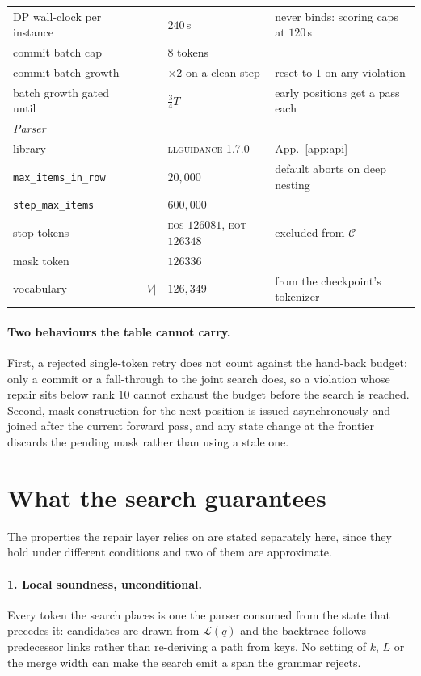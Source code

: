 \begin{center}
\begin{tabular}{llll}
DP wall-clock per instance&    & $240$\,s & never binds: scoring caps at $120$\,s \\
commit batch cap         &     & $8$ tokens & \\
commit batch growth      &     & $\times 2$ on a clean step & reset to $1$ on any violation \\
batch growth gated until &     & $\tfrac{3}{4}T$ & early positions get a pass each \\
\midrule
\multicolumn{4}{l}{\emph{Parser}}\\
library                  &     & \textsc{llguidance} 1.7.0 & App.~\ref{app:api} \\
\texttt{max\_items\_in\_row} & & $20{,}000$ & default aborts on deep nesting \\
\texttt{step\_max\_items}    & & $600{,}000$ & \\
stop tokens              &     & \textsc{eos} $126081$, \textsc{eot} $126348$ & excluded from $\mathcal{C}$ \\
mask token               &     & $126336$ & \\
vocabulary               & $|V|$ & $126{,}349$ & from the checkpoint's tokenizer \\
\bottomrule
\end{tabular}
\end{center}

\paragraph{Two behaviours the table cannot carry.}
First, a rejected single-token retry does not count against the hand-back
budget: only a commit or a fall-through to the joint search does, so a violation
whose repair sits below rank $10$ cannot exhaust the budget before the search is
reached. Second, mask construction for the next position is issued
asynchronously and joined after the current forward pass, and any state change
at the frontier discards the pending mask rather than using a stale one.

\section{What the search guarantees}
\label{app:properties}

The properties the repair layer relies on are stated separately here, since they
hold under different conditions and two of them are approximate.

\paragraph{1. Local soundness, unconditional.}
Every token the search places is one the parser consumed from the state that
precedes it: candidates are drawn from $\mathcal{L}(q)$ and the backtrace follows
predecessor links rather than re-deriving a path from keys. No setting of $k$,
$L$ or the merge width can make the search emit a span the grammar rejects.

